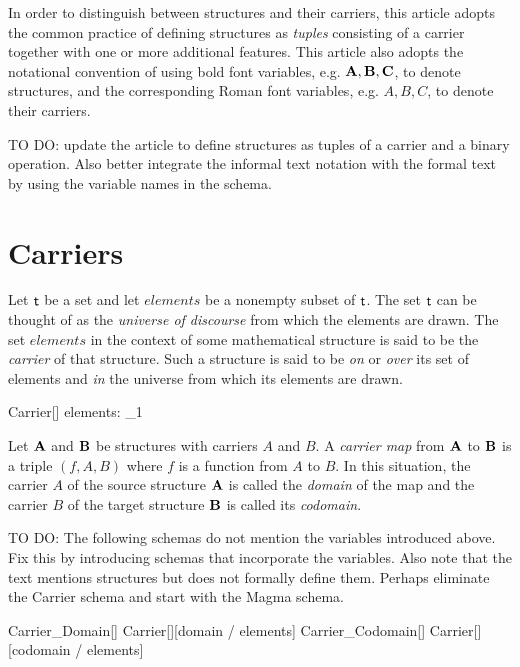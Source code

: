 \documentclass{amsart}
\begin{document}
In order to distinguish between structures and their carriers, 
this article adopts the common practice of defining structures as \textit{tuples}
consisting of a carrier together with one or more additional features.
This article also adopts the notational convention of using bold font variables, e.g. $\mathbf{A}, \mathbf{B}, \mathbf{C}$,
to denote structures, and the corresponding Roman font variables, e.g. $A, B, C$, to denote their carriers.

TO DO: update the article to define structures as tuples of a carrier and a binary operation.
Also better integrate the informal text notation with the formal text by using the variable names in the schema.

\section{Carriers}

Let $\mathsf{t}$ be a set and let $elements$ be a nonempty subset of $\mathsf{t}$.
The set $\mathsf{t}$ can be thought of as the \textit{universe of discourse} from which the elements are drawn.
The set $elements$ in the context of some mathematical structure is said to be the \textit{carrier} of that structure.
Such a structure is said to be \textit{on} or \textit{over} its set of elements
and \textit{in} the universe from which its elements are drawn.
\begin{schema}{Carrier}[\genT]
	elements: \power_1 \genT
\end{schema}

Let $\mathbf{A}$ and $\mathbf{B}$ be structures with carriers $A$ and $B$.
A \textit{carrier map} from $\mathbf{A}$ to $\mathbf{B}$ is a triple $(f, A, B)$ where $f$ is a function from $A$ to $B$.
In this situation, the carrier $A$ of the source structure $\mathbf{A}$ is called the \textit{domain} of the map 
and the carrier $B$ of the target structure $\mathbf{B}$ is called its \textit{codomain}.

TO DO: The following schemas do not mention the variables introduced above. 
Fix this by introducing schemas that incorporate the variables.
Also note that the text mentions structures but does not formally define them.
Perhaps eliminate the Carrier schema and start with the Magma schema.

\begin{zed}
	Carrier\_Domain[\genT]  Carrier[\genT][domain / elements]
\also
	Carrier\_Codomain[\genT]  Carrier[\genT][codomain / elements]
\end{zed}
\end{document}
